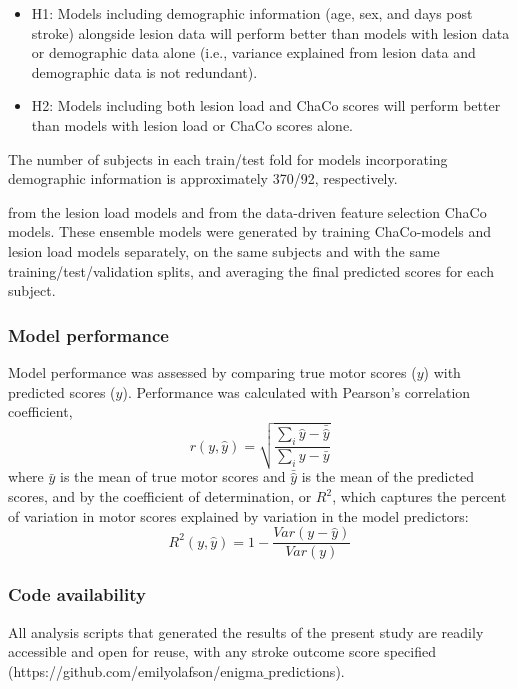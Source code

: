 \documentclass[10pt]{article}
\begin{document}
\begin{itemize}
\item H1: Models including demographic information (age, sex, and days post stroke) alongside lesion data will perform better than models with lesion data or demographic data alone (i.e., variance explained from lesion data and demographic data is not redundant).
\item H2: Models including both lesion load and ChaCo scores will perform better than models with lesion load or ChaCo scores alone.
\end{itemize}

 The number of subjects in each train/test fold for models incorporating demographic information is approximately 370/92, respectively.

from the lesion load models and from the data-driven feature selection ChaCo models. These ensemble models were generated by training ChaCo-models and lesion load models separately, on the same subjects and with the same training/test/validation splits, and averaging the final predicted scores for each subject. 



\subsubsection*{Model performance}
Model performance was assessed by comparing true motor scores ($y$) with predicted scores ($\hat{y}$). Performance was calculated with Pearson's correlation coefficient, 
\begin{equation}
    r(y, \hat{y}) = \sqrt{\frac{\sum_i{\hat{y}-\bar{\hat{y}}}}{\sum_i{y-\bar{y}}}}
\end{equation}
where $\bar{y}$ is the mean of true motor scores and  $\bar{\hat{y}}$ is the mean of the predicted scores, and by the coefficient of determination, or $R^2$, which captures the percent of variation in motor scores explained by variation in the model predictors:
\begin{equation}
    R^2(y, \hat{y}) = 1 - \frac{Var(y-\hat{y})}{Var(y)}
\end{equation}


\subsubsection*{Code availability}
All analysis scripts that generated the results of the present study are readily accessible and open for reuse, with any stroke outcome score specified (https://github.com/emilyolafson/enigma$\_$predictions).
\end{document}
